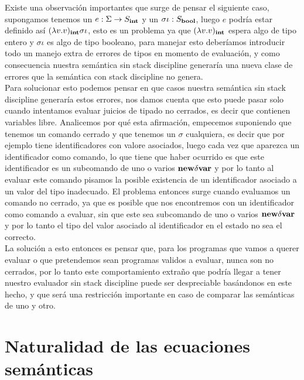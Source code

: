 Existe una observaci\'on importantes que surge de pensar el siguiente caso,
supongamos tenemos un $e : \Sigma \rightarrow S_{\textbf{int}}$ y un $\sigma \iota : S_{\textbf{bool}}$,
luego $e$ podr\'ia estar definido as\'i $(\lambda v . v)_{\textbf{int}}\sigma \iota$, esto es
un problema ya que $(\lambda v . v)_{\textbf{int}}$ espera algo de tipo entero y 
$\sigma \iota$ es algo de tipo booleano, para manejar esto deber\'iamos 
introducir todo un manejo extra de errores de tipos en momento de evaluaci\'on, 
y como consecuencia nuestra sem\'antica sin stack discipline generar\'ia una
nueva clase de errores que la sem\'antica con stack discipline no genera.\\

Para solucionar esto podemos pensar en que casos nuestra sem\'antica sin
stack discipline generar\'ia estos errores, nos damos cuenta que esto puede pasar
solo cuando intentamos evaluar juicios de tipado no cerrados, es decir que 
contienen variables libre. Analicemos por qu\'e esta afirmaci\'on, empecemos
suponiendo que tenemos un comando cerrado y que tenemos un $\sigma$ cualquiera,
es decir que por ejemplo tiene identificadores con valore asociados, luego
cada vez que aparezca un identificador como comando, lo que tiene que haber ocurrido
es que este identificador es un subcomando de uno o varios $\textbf{new} \delta \textbf{var}$ y por lo
tanto al evaluar este comando pisamos la posible existencia de un identificador
asociado a un valor del tipo inadecuado. El problema entonces surge cuando evaluamos
un comando no cerrado, ya que es posible que nos encontremos con un identificador
como comando a evaluar, sin que este sea subcomando de uno o varios $\textbf{new} \delta \textbf{var}$
y por lo tanto el tipo del valor asociado al identificador en el estado no sea el 
correcto.\\

La soluci\'on a esto entonces es pensar que, para los programas que vamos a
querer evaluar o que pretendemos sean programas validos a evaluar, nunca 
son no cerrados, por lo tanto este comportamiento extraño que podr\'ia llegar
a tener nuestro evaluador sin stack discipline puede ser despreciable bas\'andonos
en este hecho, y que ser\'a una restricci\'on importante en caso de comparar
las sem\'anticas de uno y otro.\\

\section{Naturalidad de las ecuaciones sem\'anticas}

